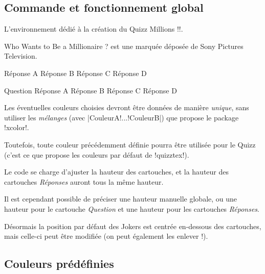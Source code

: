 \documentclass[french,a4paper,11pt]{article}
\newcommand\cmaj[1]{\tcbox[vignetteMaJ]{#1}\xspace}
\begin{document}
\subsection{Commande et fonctionnement global}

\begin{cautionblock}
L'environnement dédié à la création du Quizz \og Millions \fg{} \motcletex!\QuizzMillions!.

\smallskip

\textsf{Who Wants to Be a Millionaire ?\texttrademark} est une marquée déposée de Sony Pictures Television.
\end{cautionblock}

\begin{DemoCode}
	{Réponse A}
	{Réponse B}
	{Réponse C}
	{Réponse D}
\end{DemoCode}

\begin{DemoCode}
\QuizzMillions
	{Question}
	{Réponse A}
	{Réponse B}
	{Réponse C}
	{Réponse D}
\end{DemoCode}

\begin{tipblock}
Les éventuelles couleurs choisies devront être données de manière \textit{unique}, sans utiliser les \textit{mélanges} (avec \motcletex|CouleurA!...!CouleurB|) que propose le package \packagetex!xcolor!.

Toutefois, toute couleur précédemment définie pourra être utilisée pour le Quizz (c'est ce que propose les couleurs par défaut de \packagetex!quizztex!).
\end{tipblock}

\begin{importantblock}
Le code se charge d'ajuster la hauteur des cartouches, et la hauteur des cartouches \textit{Réponses} auront tous la même hauteur.

\smallskip

Il est cependant possible de préciser une hauteur manuelle globale, ou une hauteur pour le cartouche \textit{Question} et une hauteur pour les cartouches \textit{Réponses}.

\smallskip

\cmaj{0.1.1} Désormais la position par défaut des \textsf{Jokers} est centrée en-dessous des cartouches, mais celle-ci peut être modifiée (on peut également les enlever !).
\end{importantblock}

\subsection{Couleurs prédéfinies}
\end{document}
